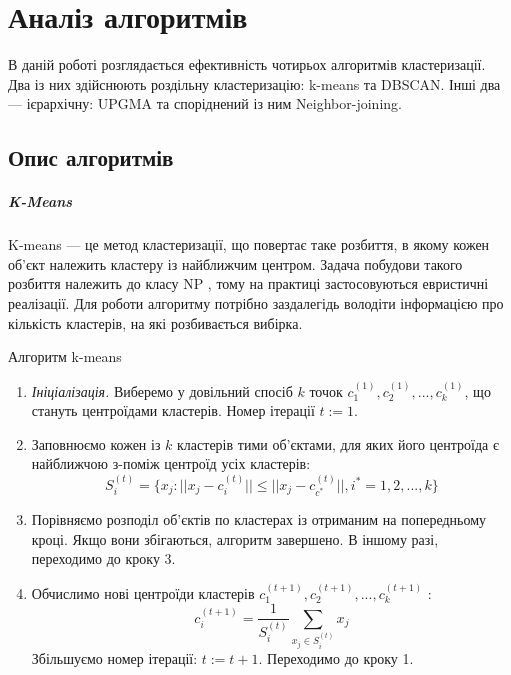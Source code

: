 \chapter {Аналіз алгоритмів}

    В даній роботі розглядається ефективність чотирьох алгоритмів кластеризації. Два із них здійснюють роздільну кластеризацію: k-means та DBSCAN. Інші два --- ієрархічну: UPGMA та споріднений із ним Neighbor-joining.

    \section {Опис алгоритмів}
        \paragraph {K-Means}
            K-means --- це метод кластеризації, що повертає таке розбиття, в якому кожен об'єкт належить кластеру із найближчим центром. Задача побудови такого розбиття належить до класу NP \cite{KmeansNpHard}, тому на практиці застосовуються евристичні реалізації.
            Для роботи алгоритму потрібно заздалегідь володіти інформацією про кількість кластерів, на які розбивається вибірка.
            \begin{algorithm}
                \caption {Алгоритм k-means}
                \begin{enumerate}
                    \item[ ] \emph {Ініціалізація.}
                        Виберемо у довільний спосіб $k$ точок $c_1^{(1)}, c_2^{(1)}, ..., c_k^{(1)}$, що стануть центроїдами кластерів. Номер ітерації $t := 1$.
                    \item
                        Заповнюємо кожен із $k$ кластерів тими об'єктами, для яких його центроїда є найближчою з-поміж центроїд усіх кластерів:
                        \begin{equation}
                            S_i^{(t)} = \{x_j : ||x_j - c_i^{(t)}|| \leq ||x_j - c_{c^*}^{(t)}||, 
                            i^* = 1, 2, ..., k\}
                        \end{equation}
                    \item
                        Порівняємо розподіл об'єктів по кластерах із отриманим на попередньому кроці.
                        Якщо вони збігаються, алгоритм завершено. В іншому разі, переходимо до кроку 3.
                    \item
                        Обчислимо нові центроїди кластерів $c_1^{(t+1)}, c_2^{(t+1)}, ..., c_k^{(t+1)}$ :
                        \begin{equation}
                            c_i^{(t+1)} = \frac{1} {S_i^{(t)}} \sum_{x_j \in S_i^{(t)}} x_j
                        \end{equation}
                        Збільшуємо номер ітерації: $t := t + 1$.
                        Переходимо до кроку 1.                        
                \end{enumerate}
            \end{algorithm}
            
